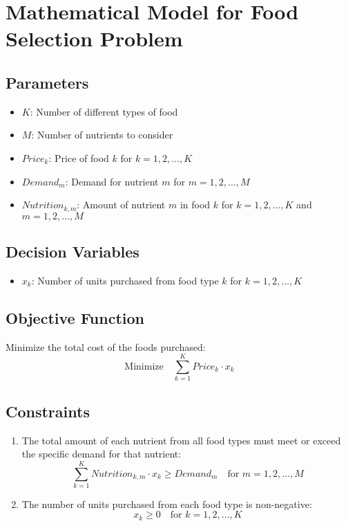 \documentclass{article}
\begin{document}
\section*{Mathematical Model for Food Selection Problem}

\subsection*{Parameters}
\begin{itemize}
    \item $K$: Number of different types of food
    \item $M$: Number of nutrients to consider
    \item $Price_k$: Price of food $k$ for $k = 1, 2, \ldots, K$
    \item $Demand_m$: Demand for nutrient $m$ for $m = 1, 2, \ldots, M$
    \item $Nutrition_{k,m}$: Amount of nutrient $m$ in food $k$ for $k = 1, 2, \ldots, K$ and $m = 1, 2, \ldots, M$
\end{itemize}

\subsection*{Decision Variables}
\begin{itemize}
    \item $x_k$: Number of units purchased from food type $k$ for $k = 1, 2, \ldots, K$
\end{itemize}

\subsection*{Objective Function}
Minimize the total cost of the foods purchased:
\[
\text{Minimize} \quad \sum_{k=1}^{K} Price_k \cdot x_k
\]

\subsection*{Constraints}
\begin{enumerate}
    \item The total amount of each nutrient from all food types must meet or exceed the specific demand for that nutrient:
    \[
    \sum_{k=1}^{K} Nutrition_{k,m} \cdot x_k \geq Demand_m \quad \text{for } m = 1, 2, \ldots, M
    \]
    \item The number of units purchased from each food type is non-negative:
    \[
    x_k \geq 0 \quad \text{for } k = 1, 2, \ldots, K
    \]
\end{enumerate}
\end{document}
